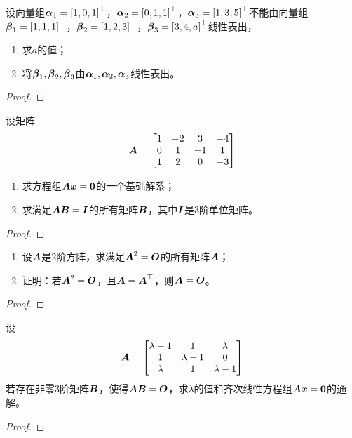 \begin{problem}\label{problem-2.17}
设向量组\(\boldsymbol{\alpha}_1=\left[ 1,0,1 \right]^\top\)，\(\boldsymbol{\alpha}_2=\left[ 0,1,1 \right]^\top\)，\(\boldsymbol{\alpha}_3=\left[ 1,3,5 \right]^\top\)不能由向量组\(\boldsymbol{\beta}_1=\left[ 1,1,1 \right]^\top\)，\(\boldsymbol{\beta}_2=\left[ 1,2,3 \right]^\top\)，\(\boldsymbol{\beta}_3=\left[ 3,4,a \right]^\top\)线性表出，
\begin{enumerate}
    \item 求\(a\)的值；
    \item 将\(\boldsymbol{\beta}_1,\boldsymbol{\beta}_2,\boldsymbol{\beta}_3\)由\(\boldsymbol{\alpha}_1,\boldsymbol{\alpha}_2,\boldsymbol{\alpha}_3\)线性表出。
\end{enumerate}
\end{problem}
\begin{proof}
\end{proof}

\begin{problem}\label{problem-2.18}
设矩阵
\begin{equation*}
    \boldsymbol{A}=
    \begin{bmatrix}
        1 & -2 & 3  & -4 \\
        0 & 1  & -1 & 1  \\
        1 & 2  & 0  & -3
    \end{bmatrix}
\end{equation*}
\begin{enumerate}
    \item 求方程组\(\boldsymbol{A}\boldsymbol{x}=\boldsymbol{0}\)的一个基础解系；
    \item 求满足\(\boldsymbol{A}\boldsymbol{B}=\boldsymbol{I}\)的所有矩阵\(\boldsymbol{B}\)，其中\(\boldsymbol{I}\)是\(3\)阶单位矩阵。
\end{enumerate}
\end{problem}
\begin{proof}
\end{proof}

\begin{problem}\label{problem-2.19}
\begin{enumerate}
    \item 设\(\boldsymbol{A}\)是\(2\)阶方阵，求满足\(\boldsymbol{A}^2=\boldsymbol{O}\)的所有矩阵\(\boldsymbol{A}\)；
    \item 证明：若\(\boldsymbol{A}^2=\boldsymbol{O}\)，且\(\boldsymbol{A}=\boldsymbol{A}^\top\)，则\(\boldsymbol{A}=\boldsymbol{O}\)。
\end{enumerate}
\end{problem}
\begin{proof}
\end{proof}

\begin{problem}\label{problem-2.20}
设
\begin{equation*}
    \boldsymbol{A}=
    \begin{bmatrix}
        \lambda-1 & 1         & \lambda   \\
        1         & \lambda-1 & 0         \\
        \lambda   & 1         & \lambda-1
    \end{bmatrix}
\end{equation*}
若存在非零\(3\)阶矩阵\(\boldsymbol{B}\)，使得\(\boldsymbol{A}\boldsymbol{B}=\boldsymbol{O}\)，求\(\lambda\)的值和齐次线性方程组\(\boldsymbol{A}\boldsymbol{x}=\boldsymbol{0}\)的通解。
\end{problem}
\begin{proof}
\end{proof}

